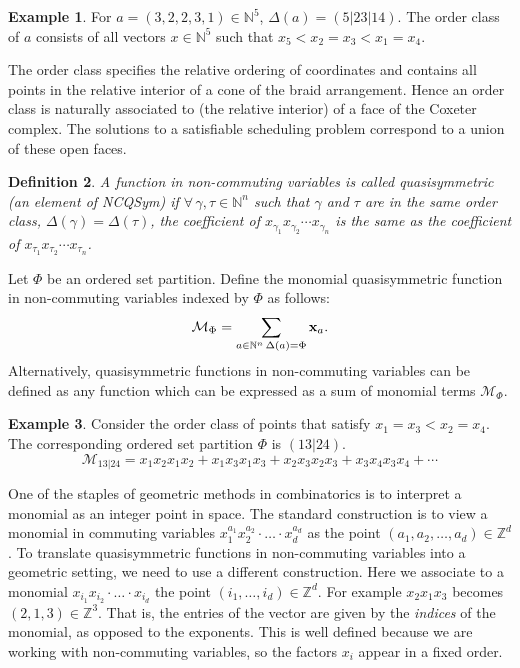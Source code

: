 \documentclass[12pt,reqno]{amsart}
\newtheorem{definition}{Definition}
\numberwithin{definition}{section}
\theoremstyle{definition}
\newtheorem{example}[definition]{Example}
\newcommand{\ZZ}{\mathbb{Z}}
\newcommand{\ncM}{\mathcal{M}}
\begin{document}
\begin{example}
For $a = (3,2,2,3,1) \in \mathbb{N}^5$, $\Delta(a) =
(5|23|14)$.  The order class of $a$ consists of all vectors $x
\in \mathbb{N}^5$ such that $x_5 < x_2 = x_3 < x_1 = x_4$. 
\end{example}


The order class specifies the relative ordering of coordinates and contains all points in the relative interior of a cone
of the braid arrangement.  Hence an order class is naturally associated to (the relative interior) of a face of
the Coxeter complex.  
The solutions to a satisfiable scheduling problem correspond to a union of these open faces.   


\begin{definition}
A function in non-commuting variables is called quasisymmetric (an element of NCQSym) if
$\forall \, \gamma, \tau \in \mathbb{N}^n$ such that $\gamma$ and $\tau$
are in the same order class, $\Delta(\gamma) =
\Delta(\tau)$, the coefficient of $x_{\gamma_1}x_{\gamma_2} \cdots
x_{\gamma_n}$ is the same as the coefficient of $x_{\tau_1}x_{\tau_2} \cdots x_{\tau_n}$.
\end{definition}



Let $\Phi$ be an ordered set partition.  Define the monomial quasisymmetric function in non-commuting variables indexed by $\Phi$ as follows:
$$\ncM_{\Phi} = \sum_{a \in \mathbb{N}^n \, \Delta(a) = \Phi} {\bf{x}}_{a}.$$
Alternatively, quasisymmetric functions in non-commuting variables can be defined as any function which can be expressed as a sum of monomial terms $\ncM_{\Phi}$.

\begin{example}
Consider the order class of points that satisfy $x_1 = x_3 < x_2 =
x_4$.  The corresponding ordered set partition $\Phi$ is $(13|24)$.
$$\ncM_{13|24} = x_1x_2x_1x_2 + x_1x_3x_1x_3 + x_2x_3x_2x_3 + x_3x_4x_3x_4 + \cdots$$  
\end{example}



 One of the staples of geometric methods in combinatorics is to
 interpret a monomial as an integer point in space. The standard
 construction is to view a monomial in commuting variables
 $x_1^{a_1}x_2^{a_2}\cdot\ldots\cdot x_d^{a_d}$ as the point
 $(a_1,a_2,\ldots,a_d)\in\ZZ^d$. To translate quasisymmetric functions
 in non-commuting variables into a geometric setting, we need to use a
 different construction. Here we associate to a monomial
 $x_{i_1} x_{i_2} \cdot \ldots \cdot x_{i_d}$ the point
 $(i_1,\ldots,i_d)\in \ZZ^d$. For example $x_2x_1x_3$ becomes
 $(2,1,3)\in\ZZ^3$. That is, the entries of the vector are given by
 the \emph{indices} of the monomial, as opposed to the exponents. This
 is well defined because we are working with non-commuting variables, so
  the factors $x_i$ appear in a fixed order.
\end{document}
